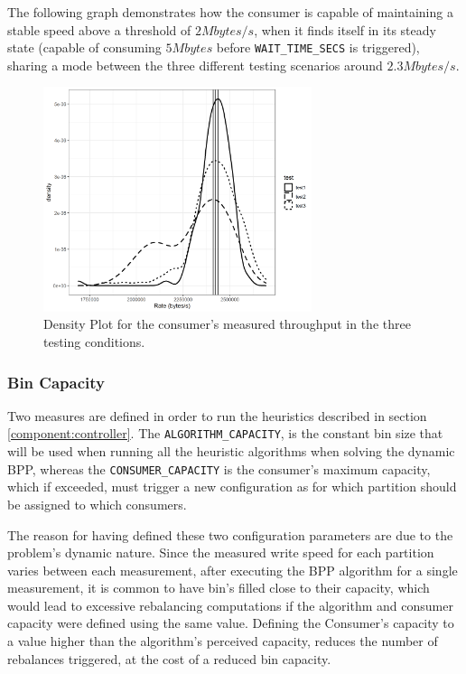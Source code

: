 The following graph demonstrates how the consumer is capable of maintaining a
stable speed above a threshold of $2 Mbytes/s$, when it finds itself in its
steady state (capable of consuming $5 Mbytes$ before
\lstinline[language=Python]{WAIT_TIME_SECS} is triggered), sharing a mode
between the three different testing scenarios around $2.3 Mbytes/s$.

\begin{figure}[H] \centering
\includegraphics[width=0.7\textwidth]{images/consumer/density.png}
\caption{
    Density Plot for the consumer's measured throughput in the three testing
    conditions.
} 
\label{fig:consumer_capacity} 
\end{figure}

\subsubsection{Bin Capacity} \label{result:bin capacity}

Two measures are defined in order to run the heuristics described in section
\ref{component:controller}. The \lstinline{ALGORITHM_CAPACITY},
is the constant bin size that will be used when running all the heuristic
algorithms when solving the dynamic BPP, whereas the
\lstinline{CONSUMER_CAPACITY} is the consumer's maximum
capacity, which if exceeded, must trigger a new configuration as for which
partition should be assigned to which consumers.

The reason for having defined these two configuration parameters are due to the
problem's dynamic nature. Since the measured write speed for each partition
varies between each measurement, after executing the BPP algorithm for a single
measurement, it is common to have bin's filled close to their capacity, which
would lead to excessive rebalancing computations if the algorithm and consumer
capacity were defined using the same value. Defining the Consumer's capacity to
a value higher than the algorithm's perceived capacity, reduces the number of
rebalances triggered, at the cost of a reduced bin capacity. 


